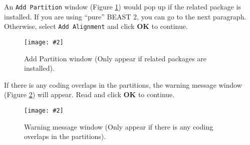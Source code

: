 \documentclass[11pt]{article}
\newcommand{\TODO}[1]{}
\theoremstyle{plain}%
\theoremstyle{definition}
\theoremstyle{remark}
\newcommand{\includeimage}[2][]{%
\texttt{[image: \#2]}
}
\begin{document}
%
%
%

%
%

An \texttt{Add Partition} window (Figure \ref{fig:addPartition}) would pop up if the related package is installed. If you are using ``pure'' BEAST 2, you can go to the next paragraph.    
Otherwise, select \texttt{Add Alignment} and click \textbf{OK} to continue.

\begin{figure}
\centering	
\includeimage[width=0.5\textwidth]{figures/AddPartition}
\label{fig:addPartition}
\caption{Add Partition window (Only appear if related packages are installed).}
\end{figure}

If there is any coding overlaps in the partitions, the warning message window (Figure \ref{fig:warning}) will appear. Read and click \textbf{OK} to continue.

\begin{figure}	
\centering	
\includeimage[width=0.9\textwidth]{figures/warning}
\label{fig:warning}
\caption{Warning message window (Only appear if there is any coding overlaps in the partitions).}
\end{figure}
\end{document}
